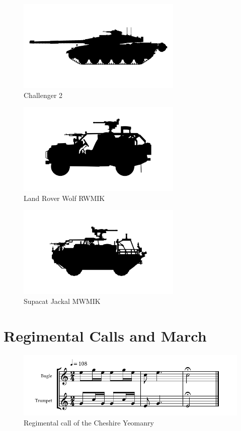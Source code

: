 \begin{figure}[h]
  \centering
  \includegraphics[width=0.7\textwidth]{platforms/challenger.pdf}
  \caption*{Challenger 2}
\end{figure}

\begin{figure}[h]
  \centering
  \includegraphics[width=0.7\textwidth]{platforms/wmik.pdf}
  \caption*{Land Rover Wolf RWMIK}
\end{figure}

\begin{figure}[h]
  \centering
  \includegraphics[width=0.7\textwidth]{platforms/jackal.pdf}
  \caption*{Supacat Jackal MWMIK}
\end{figure}

\chapter{Regimental Calls and March}

\begin{figure}[h]
  \centering
  \includegraphics[width=\textwidth]{gazette/cheshire-yeomanry-call.pdf}
  \caption*{Regimental call of the Cheshire Yeomanry~\cite[p11]{trumpet-and-bugle-calls}}
\end{figure}

